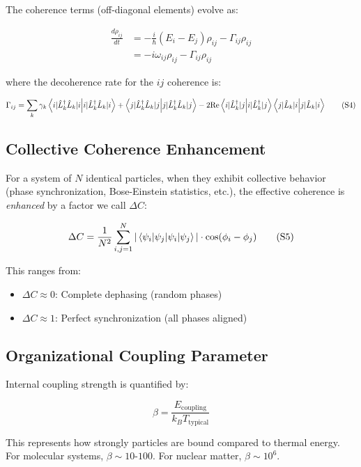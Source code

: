 \documentclass[12pt,a4paper]{article}
\begin{document}
The coherence terms (off-diagonal elements) evolve as:

\begin{align}
\frac{d\rho_{ij}}{dt} &= -\frac{i}{\hbar}(E_i - E_j)\rho_{ij} - \Gamma_{ij} \rho_{ij} \\
&= -i\omega_{ij}\rho_{ij} - \Gamma_{ij} \rho_{ij}
\tag{S3}
\end{align}

where the decoherence rate for the $ij$ coherence is:

\begin{equation}
\Gamma_{ij} = \sum_k \gamma_k \braket{i|\hat{L}_k^\dagger \hat{L}_k|i} + \braket{j|\hat{L}_k^\dagger \hat{L}_k|j} - 2\text{Re}\braket{i|\hat{L}_k^\dagger|j}\braket{j|\hat{L}_k|i}
\tag{S4}
\end{equation}

\subsection{Collective Coherence Enhancement}

For a system of $N$ identical particles, when they exhibit collective behavior (phase synchronization, Bose-Einstein statistics, etc.), the effective coherence is \emph{enhanced} by a factor we call $\Delta C$:

\begin{equation}
\Delta C = \frac{1}{N^2}\sum_{i,j=1}^{N} |\braket{\psi_i|\psi_j}| \cdot \cos(\phi_i - \phi_j)
\tag{S5}
\end{equation}

This ranges from:
\begin{itemize}
    \item $\Delta C \approx 0$: Complete dephasing (random phases)
    \item $\Delta C \approx 1$: Perfect synchronization (all phases aligned)
\end{itemize}

\subsection{Organizational Coupling Parameter}

Internal coupling strength is quantified by:

\begin{equation}
\beta = \frac{E_{\text{coupling}}}{k_B T_{\text{typical}}}
\tag{S6}
\end{equation}

This represents how strongly particles are bound compared to thermal energy. For molecular systems, $\beta \sim 10$-$100$. For nuclear matter, $\beta \sim 10^6$.
\end{document}

